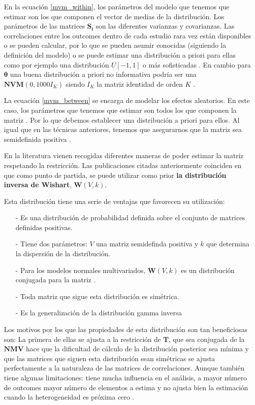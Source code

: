\documentclass[a4paper,openright,12pt]{report}
\begin{document}
En la ecuación \ref{mvm_within}, los parámetros del modelo que tenemos que estimar son los que componen el vector de medias de la distribución. Los parámetros de las matrices $\mathbf{S_{i}}$ son las diferentes varianzas y covarianzas. Las correlaciones entre los outcomes dentro de cada estudio rara vez están disponibles o se pueden calcular, por lo que se pueden asumir conocidas (siguiendo la definición del modelo) o se puede estimar una distribución a priori para ellas como por ejemplo una distribución $U\left[-1,1\right]$ o más sofisticadas \cite{Bujkiewicz2013}. En cambio para $\mathbf{\theta}$ una buena distribución a priori no informativa podría ser una $\mathbf{NVM}(0,1000I_{K})$ siendo $I_{K}$ la matriz identidad de orden $K$ \cite{Wei2013_2}.

La ecuación \ref{mvm_between} se encarga de modelar los efectos aleatorios. En este caso, los parámetros que tenemos que estimar son todos los que componen la matriz . Por lo que debemos establecer una distribución a priori para ellos. Al igual que en las técnicas anteriores, tenemos que asegurarnos que la matriz  sea semidefinida positiva \cite{Nam2003}\cite{Jackson2011}\cite{Wei2013}\cite{Mavridis2011}.

En la literatura vienen recogidas diferentes maneras de poder estimar la matriz respetando la restricción. Las publicaciones citadas anteriormente coinciden en que como punto de partida, se puede utilizar como prior \textbf{la distribución inversa de Wishart}, $\mathbf{W}(V,k)$. 

Esta distribución tiene una serie de ventajas que favorecen su utilización:
\begin{itemize}
\item[-] Es una distribución de probabilidad definida sobre el conjunto de matrices definidas positivas.
\item[-] Tiene dos parámetros: $V$ una matriz semidefinda positiva y $k$ que determina la dispersión de la distribución.
\item[-] Para los modelos normales multivariados, $\mathbf{W}(V,k)$ es un distribución conjugada para la matriz .
\item[-] Toda matriz que sigue esta distribución es simétrica.
\item[-] Es la generalización de la distribución gamma inversa
\end{itemize}

Los motivos por los que las propiedades de esta distribución son tan beneficiosas son: La primera de ellas se ajusta a la restricción de $\mathbf{T}$, que sea conjugada de la $\mathbf{NMV}$ hace que la dificultad de cálculo de la distribución posterior sea mínima \cite{Wei2013}y que las matrices que siguen esta distribución sean simétricas se ajusta perfectamente a la naturaleza de las matrices de correlaciones. Aunque también tiene algunas limitaciones: tiene mucha influencia en el análisis, a mayor número de outcomes mayor número de elementos a estima y no ajusta bien la estimación cuando la heterogeneidad es próxima cero \cite{Wei2013}\cite{Mavridis2011}.
\end{document}
